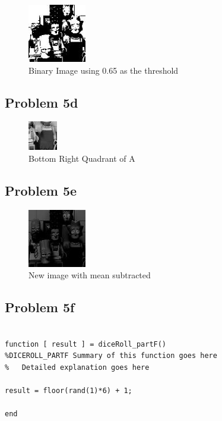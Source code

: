 \documentclass[11pt,psfig]{article}
\begin{document}
\begin{figure}[H]
\centering
\includegraphics[height=1in]{partCimage.jpg}
\caption{Binary Image using 0.65 as the threshold}
\end{figure}

\subsection*{Problem 5d}

\begin{figure}[H]
\centering
\includegraphics[height=0.5in]{partDimage.jpg}
\caption{Bottom Right Quadrant of A}
\end{figure}

\subsection*{Problem 5e}

\begin{figure}[H]
\centering
\includegraphics[height=1in]{partEimage.jpg}
\caption{New image with mean subtracted}
\end{figure}

\subsection*{Problem 5f}

\begin{verbatim}

function [ result ] = diceRoll_partF()
%DICEROLL_PARTF Summary of this function goes here
%   Detailed explanation goes here

result = floor(rand(1)*6) + 1;

end

\end{verbatim}
\end{document}
